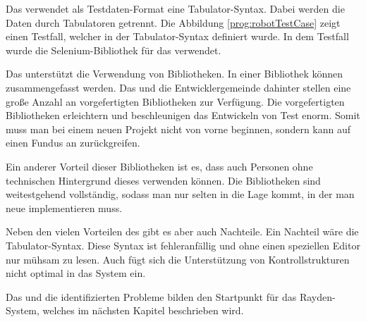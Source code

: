 \SuperPar
Das  verwendet als Testdaten-Format eine Tabulator-Syntax. Dabei werden die Daten durch Tabulatoren getrennt. Die Abbildung \ref{prog:robotTestCase} zeigt einen Testfall, welcher in der Tabulator-Syntax definiert wurde. In dem Testfall wurde die Selenium-Bibliothek für das  verwendet. 

\SuperPar
Das  unterstützt die Verwendung von Bibliotheken. In einer Bibliothek können  zusammengefasst werden. Das  und die Entwicklergemeinde dahinter stellen eine große Anzahl an vorgefertigten Bibliotheken zur Verfügung. Die vorgefertigten Bibliotheken erleichtern und beschleunigen das Entwickeln von Test enorm. Somit muss man bei einem neuen Projekt nicht von vorne beginnen, sondern kann auf einen Fundus an  zurückgreifen.

\SuperPar
Ein anderer Vorteil dieser Bibliotheken ist es, dass auch Personen ohne technischen Hintergrund dieses  verwenden können. Die Bibliotheken sind weitestgehend vollständig, sodass man nur selten in die Lage kommt, in der man neue  implementieren muss.

\SuperPar
Neben den vielen Vorteilen des  gibt es aber auch Nachteile. Ein Nachteil wäre die Tabulator-Syntax. Diese Syntax ist fehleranfällig und ohne einen speziellen Editor nur mühsam zu lesen. Auch fügt sich die Unterstützung von Kontrollstrukturen nicht optimal in das System ein.

\SuperPar
Das  und die identifizierten Probleme bilden den Startpunkt für das Rayden-System, welches im nächsten Kapitel beschrieben wird.

